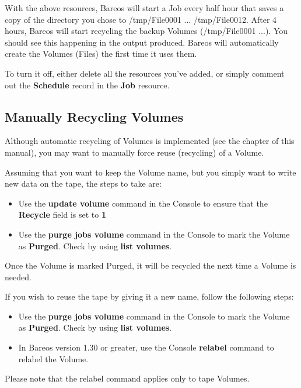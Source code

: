 With the above resources, Bareos will start a Job every half hour that saves a
copy of the directory you chose to /tmp/File0001 ... /tmp/File0012. After 4
hours, Bareos will start recycling the backup Volumes (/tmp/File0001 ...). You
should see this happening in the output produced. Bareos will automatically
create the Volumes (Files) the first time it uses them.

To turn it off, either delete all the resources you've added, or simply
comment out the {\bf Schedule} record in the {\bf Job} resource.

\subsection{Manually Recycling Volumes}
\label{manualrecycling}


Although automatic recycling of Volumes is implemented (see the
 chapter of
this manual), you may want to manually force reuse (recycling) of a Volume.

Assuming that you want to keep the Volume name, but you simply want to write
new data on the tape, the steps to take are:

\begin{itemize}
\item Use the {\bf update volume} command in the Console to  ensure that the
   {\bf Recycle} field is set to {\bf 1}
\item Use the {\bf purge jobs volume} command in the Console  to mark the
   Volume as {\bf Purged}. Check by using  {\bf list volumes}.
\end{itemize}

Once the Volume is marked Purged, it will be recycled the next time a Volume
is needed.

If you wish to reuse the tape by giving it a new name, follow the following
steps:

\begin{itemize}
\item Use the {\bf purge jobs volume} command in the Console  to mark the
   Volume as {\bf Purged}. Check by using  {\bf list volumes}.
\item In Bareos version 1.30 or greater, use the Console  {\bf relabel}
   command to relabel the Volume.
\end{itemize}

Please note that the relabel command applies only to tape Volumes.

